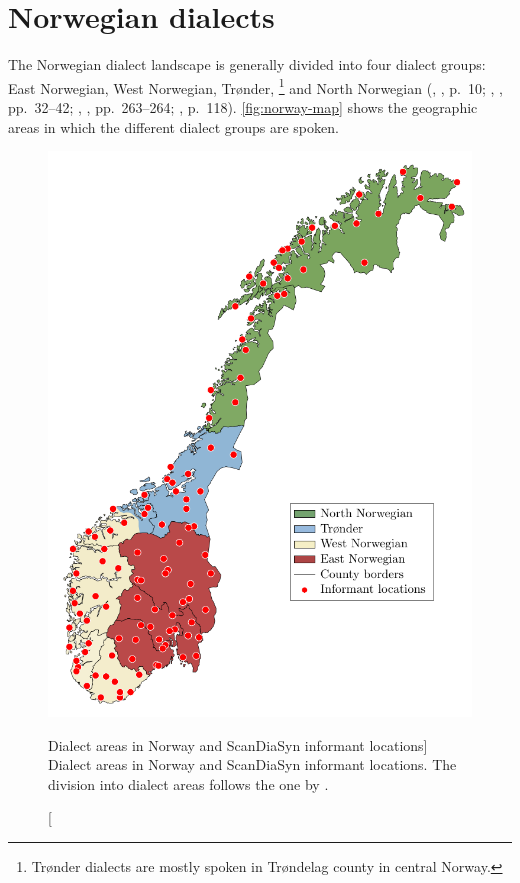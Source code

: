 \section{Norwegian dialects}
\label{sec:dialects-dialectology}

The Norwegian dialect landscape is generally divided into four dialect groups: East Norwegian, West Norwegian, Trønder,%
\footnote{Trønder dialects are mostly spoken in Trøndelag county in central Norway.}
and North Norwegian 
(\citeauthor{jahr1990dialekter}, \citeyear{jahr1990dialekter}, p.~10; \citeauthor{maehlum2012dialektlandskapet}, \citeyear{maehlum2012dialektlandskapet}, pp.~32--42; \citeauthor{bardhdal1997nordiska}, \citeyear{bardhdal1997nordiska}, pp.~263--264; \citeauthor{hanssen2010dialekter}, p.~118).
\autoref{fig:norway-map} shows the geographic areas in which the different dialect groups are spoken.

\begin{figure}[ht]
    \centering
    \includegraphics[width=\textwidth]{figures/3-dialects/dialect-map.pdf}
    \caption
    [Dialect areas in Norway and ScanDiaSyn informant locations]
    {Dialect areas in Norway and ScanDiaSyn informant locations.
    The division into dialect areas follows the one by \citet[p.~178]{maehlum2012dialektlandskapet}.}
    \label{fig:norway-map}
\end{figure}


